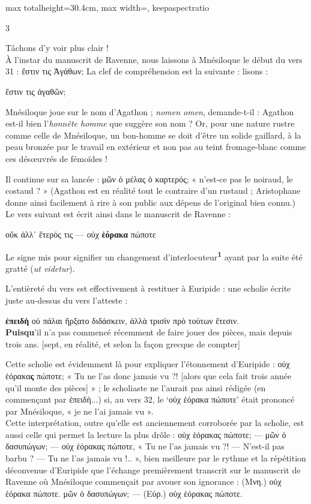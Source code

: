 \documentclass[11pt,twoside]{book}
\newcommand{\italique}[1]{\textit{#1}}
\newcommand{\citComm}[1]{\begin{quoting}[vskip=0.4pt,leftmargin=0.7em,rightmargin=0.2em]#1\end{quoting}}
\newcommand{\latin}[1]{\textit{#1}}
\newcommand{\marqueur}[1]{\textsuperscript{\color{rubricRed}\textbf{#1}}}
\begin{document}
\begin{adjustbox}{max totalheight=30.4cm, max width=\textwidth, keepaspectratio}
\begin{minipage}{\textwidth}
{\begin{multicols}{3}
\par\vspace{1.5pt}
\noindent Tâchons d'y voir plus clair !\\ À l'instar du manuscrit de Ravenne, nous laissons à Mnésiloque le début du vers 31 : ἔστιν τις Ἀγάθων;  La clef de compréhension est la suivante : lisons :
\citComm{ἔστιν τις ἀγαθῶν;}
\par\vspace{1.5pt}
\noindent Mnésiloque joue sur le nom d'Agathon ; \latin{nomen omen}, demande-t-il : Agathon est-il bien l'\italique{honnête homme} que suggère son nom ? Or, pour une nature rustre comme celle de Mnésiloque, un bon-homme se doit d'être un solide gaillard, à la peau bronzée par le travail en extérieur et non pas au teint fromage-blanc comme ces désœuvrés de fémoïdes !
\par\vspace{1.5pt}
\noindent Il continue sur sa lancée : μῶν ὁ μέλας ὁ καρτερός; « n'est-ce pas le noiraud, le costaud ? » (Agathon est en réalité tout le contraire d'un rustaud ; Aristophane donne ainsi facilement à rire à son public aux dépens de l'original bien connu.)\\ Le vers suivant est écrit ainsi dans le manuscrit de Ravenne :
\citComm{οὔκ ἀλλ᾽ ἕτερός τις --- οὐχ \textbf{ἑόρακα} πώποτε}
\par\vspace{1.5pt}
\noindent Le signe mis pour signifier un changement d'interlocuteur\marqueur{1} ayant par la suite été gratté (\latin{ut videtur}).
\par\vspace{1.5pt}
\noindent L'entièreté du vers est effectivement à restituer à Euripide : une scholie écrite juste au-dessus du vers l'atteste :
\citComm{\textbf{ἐπειδὴ} οὐ πάλαι ἤρξατο διδάσκειν, ἀλλὰ τρισὶν πρὸ τούτων ἔτεσιν.\\
\textbf{Puisqu}'il n'a pas commencé récemment de faire jouer des pièces, mais depuis trois ans. [sept, en réalité, et selon la façon grecque de compter]}
\par\vspace{1.5pt}
\noindent Cette scholie est évidemment là pour expliquer l'étonnement d'Euripide : οὐχ ἑόρακα\textbf{ς} πώποτε; « Tu ne l'as donc jamais vu ?! [alors que cela fait trois année qu'il monte des pièces] » ; le scholiaste ne l'aurait pas ainsi rédigée (en commençant par ἐπειδὴ...) si, au vers 32, le `οὐχ ἑόρακα πώποτε' était prononcé par Mnésiloque, « je ne l'ai jamais vu ».\\ Cette interprétation, outre qu'elle est anciennement corroborée par la scholie, est aussi celle qui permet la lecture la plus drôle : οὐχ ἑόρακας πώποτε; --- μῶν ὁ δασυπώγων; --- οὐχ ἑόρακας πώποτε, « Tu ne l'as jamais vu ?! --- N'est-il pas barbu ? --- Tu ne l'as jamais vu !.. », bien meilleure par le rythme et la répétition déconvenue d'Euripide que l'échange premièrement transcrit sur le manuscrit de Ravenne où Mnésiloque commençait par avouer son ignorance : (Μνη.) οὐχ ἑόρακα πώποτε. μῶν ὁ δασυπώγων; --- (Εὐρ.) οὐχ ἑόρακας πώποτε.

\end{multicols}}
\end{minipage}
\end{adjustbox}
\end{document}
